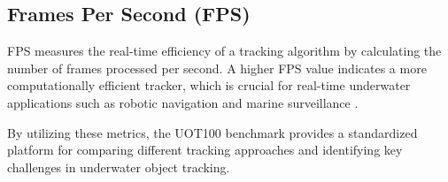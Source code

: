\subsection{Frames Per Second (FPS)}
FPS measures the real-time efficiency of a tracking algorithm by calculating the number of frames processed per second. A higher FPS value indicates a more computationally efficient tracker, which is crucial for real-time underwater applications such as robotic navigation and marine surveillance \cite{nam2016learning}.

By utilizing these metrics, the UOT100 benchmark provides a standardized platform for comparing different tracking approaches and identifying key challenges in underwater object tracking.

\endinput